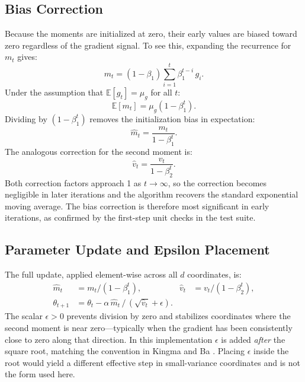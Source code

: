 ﻿\documentclass[conference]{IEEEtran}
\begin{document}
\subsection{Bias Correction}
Because the moments are initialized at zero, their early values are biased toward zero regardless of the gradient signal. To see this, expanding the recurrence for $m_t$ gives:
\begin{equation}
  m_t = (1-\beta_1)\sum_{i=1}^{t}\beta_1^{t-i}\,g_i.
\end{equation}
Under the assumption that $\mathbb{E}[g_t]=\mu_g$ for all $t$:
\begin{equation}
  \mathbb{E}[m_t] = \mu_g\left(1 - \beta_1^t\right).
\end{equation}
Dividing by $(1-\beta_1^t)$ removes the initialization bias in expectation:
\begin{equation}
  \hat{m}_t = \frac{m_t}{1-\beta_1^t}.
\end{equation}
The analogous correction for the second moment is:
\begin{equation}
  \hat{v}_t = \frac{v_t}{1-\beta_2^t}.
\end{equation}
Both correction factors approach 1 as $t\to\infty$, so the correction becomes negligible in later iterations and the algorithm recovers the standard exponential moving average. The bias correction is therefore most significant in early iterations, as confirmed by the first-step unit checks in the test suite.

\subsection{Parameter Update and Epsilon Placement}
The full update, applied element-wise across all $d$ coordinates, is:
\begin{align}
  \hat{m}_t &= m_t/(1-\beta_1^t), &\hat{v}_t &= v_t/(1-\beta_2^t),\\
  \theta_{t+1} &= \theta_t - \alpha\,\hat{m}_t\,/\,(\sqrt{\hat{v}_t}+\epsilon).
\end{align}
The scalar $\epsilon > 0$ prevents division by zero and stabilizes coordinates where the second moment is near zero---typically when the gradient has been consistently close to zero along that direction. In this implementation $\epsilon$ is added \emph{after} the square root, matching the convention in Kingma and Ba \cite{kingma}. Placing $\epsilon$ inside the root would yield a different effective step in small-variance coordinates and is not the form used here.
\end{document}
